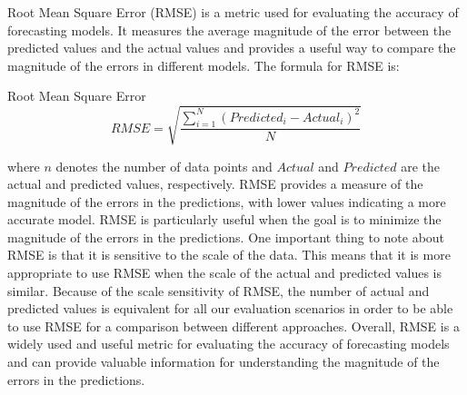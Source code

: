       Root Mean Square Error (RMSE) \cite{chaiRootMeanSquare2014} is a metric used for evaluating the accuracy of forecasting models. It measures the average magnitude of the error between the predicted values and the actual values and provides a useful way to compare the magnitude of the errors in different models.
      The formula for RMSE is:
      \begin{pabox}{Root Mean Square Error}
        $$RMSE = \sqrt{\frac{\sum_{i = 1}^{N}\left(Predicted_i - Actual_i\right)^2}{N}}$$
      \end{pabox}
      where $n$ denotes the number of data points and $Actual$ and $Predicted$ are the actual and predicted values, respectively.
      RMSE provides a measure of the magnitude of the errors in the predictions, with lower values indicating a more accurate model. 
      RMSE is particularly useful when the goal is to minimize the magnitude of the errors in the predictions.
      One important thing to note about RMSE is that it is sensitive to the scale of the data. This means that it is more appropriate to use RMSE when the scale of the actual and predicted values is similar.
      Because of the scale sensitivity of RMSE, the number of actual and predicted values is equivalent for all our evaluation scenarios in order to be able to use RMSE for a comparison between different approaches.
      Overall, RMSE is a widely used and useful metric for evaluating the accuracy of forecasting models and can provide valuable information for understanding the magnitude of the errors in the predictions.







